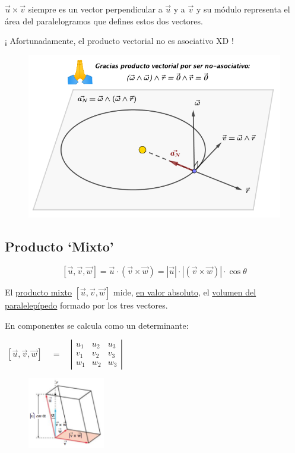 \vspace{2mm}$\vec u \times \vec v$ siempre es un vector perpendicular a $\vec u$ y a $\vec v$ y su módulo representa el área del paralelogramos que defines estos dos vectores.

\vspace{5mm} ¡ Afortunadamente, el producto vectorial no es asociativo XD !

\begin{figure}[H]
	\centering
	\includegraphics[width=.7\textwidth]{imagenes/imagenescv/T10IM11.png}
\end{figure}

\subsection{Producto `Mixto'}
\begin{equation}
\boxed{ \ [\vec u, \vec v, \vec w]=\vec u \cdot (\vec v \times \vec w)=|\vec u|\cdot|(\vec v \times \vec w)|\cdot \cos \theta \ }
\end{equation}

\begin{multicols}{2}
El \underline{producto mixto} $[\vec u, \vec v, \vec w]$ mide, \underline{en valor absoluto}, el \underline{volumen del paralelepípedo} formado por los tres vectores.
				
En componentes se calcula como un determinante:
				
$\boxed{ \ [\overrightarrow { u } ,\overrightarrow { v }, \overrightarrow { w }]  \quad =\quad \left| \begin{matrix} u_{ 1 } & u_{ 2 } & u_{ 3 } \\ v_{ 1 } & v_{ 2 } & v_{ 3 } \\ w_{ 1 } & w_{ 2 } & w_{ 3 } \end{matrix} \right| \ } $

\begin{figure}[H]
	\centering
	\includegraphics[width=0.3\textwidth]{imagenes/imagenescv/T10IM12.png}
\end{figure}
\end{multicols}


